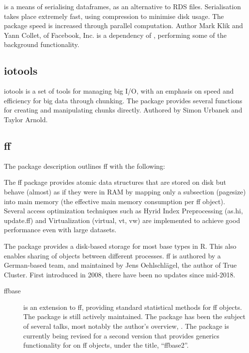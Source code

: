  is a means of serialising dataframes, as an alternative to RDS
files\cite{klik19}. Serialisation takes place extremely fast, using
compression to minimise disk usage. The package speed is increased
through parallel computation. Author Mark Klik and Yann Collet, of
Facebook, Inc.  is a dependency of , performing some of the
background functionality.

\hypertarget{sec:iotools}{%
    \subsection{iotools}\label{sec:iotools}}

iotools is a set of tools for managing big I/O, with an emphasis on
speed and efficiency for big data through chunking\cite{urbanek20b}. The
package provides several functions for creating and manipulating chunks
directly. Authored by Simon Urbanek and Taylor Arnold.

\hypertarget{sec:ff}{%
    \subsection{ff}\label{sec:ff}}

The package description outlines ff with the following:

\begin{displayquote}
    The ff package provides atomic data structures that are stored on disk
    but behave (almost) as if they were in RAM by mapping only a subsection
    (pagesize) into main memory (the effective main memory consumption per
    ff object). Several access optimization techniques such as Hyrid Index
    Preprocessing (as.hi, update.ff) and Virtualization (virtual, vt, vw)
    are implemented to achieve good performance even with large datasets.
\end{displayquote}

The package provides a disk-based storage for most base types in R. This
also enables sharing of objects between different \R processes. ff is
authored by a German-based team, and maintained by Jens Oehlschlägel,
the author of True Cluster. First introduced in
2008\cite{adler08:_large_r}, there have been no updates since
mid-2018.

\begin{description}

    \item[ffbase\cite{jonge20}]
        is an extension to ff, providing standard statistical methods for ff
        objects. The package is still actively maintained. The package has been
        the subject of several talks, most notably the author's overview,
        \cite{wijffels13}. The package is currently being revised for a second
        version that provides generics functionality for  on ff objects,
        under the title, ``ffbase2''\cite{jonge15}.
\end{description}